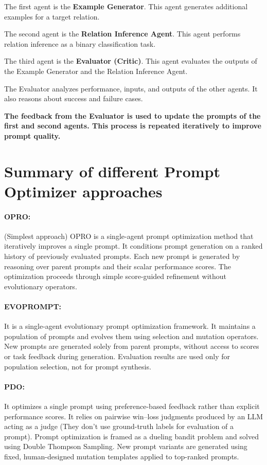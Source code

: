 \documentclass[12pt]{article}
\begin{document}
The first agent is the \textbf{Example Generator}.  
This agent generates additional examples for a target relation.  

The second agent is the \textbf{Relation Inference Agent}.  
This agent performs relation inference as a binary classification task. 

The third agent is the \textbf{Evaluator (Critic)}.  
This agent evaluates the outputs of the Example Generator and the Relation Inference Agent.  

The Evaluator analyzes performance, inputs, and outputs of the other agents.  
It also reasons about success and failure cases.  

\textbf{The feedback from the Evaluator is used to update the prompts of the first and second agents.  
This process is repeated iteratively to improve prompt quality.}



\section{Summary of different Prompt Optimizer approaches}
\label{sec:summary}

\paragraph{OPRO:} (Simplest approach)
OPRO is a single-agent prompt optimization method that iteratively improves a single prompt.
It conditions prompt generation on a ranked history of previously evaluated prompts.
Each new prompt is generated by reasoning over parent prompts and their scalar performance scores.
The optimization proceeds through simple score-guided refinement without evolutionary operators.

\paragraph{EVOPROMPT:}
It is a single-agent evolutionary prompt optimization framework.
It maintains a population of prompts and evolves them using selection and mutation operators.
New prompts are generated solely from parent prompts, without access to scores or task feedback during generation.
Evaluation results are used only for population selection, not for prompt synthesis.

\paragraph{PDO:}
It optimizes a single prompt using preference-based feedback rather than explicit performance scores.
It relies on pairwise win–loss judgments produced by an LLM acting as a judge (They don't use ground-truth labels for evaluation of a prompt).
Prompt optimization is framed as a dueling bandit problem and solved using Double Thompson Sampling.
New prompt variants are generated using fixed, human-designed mutation templates applied to top-ranked prompts.
\end{document}
